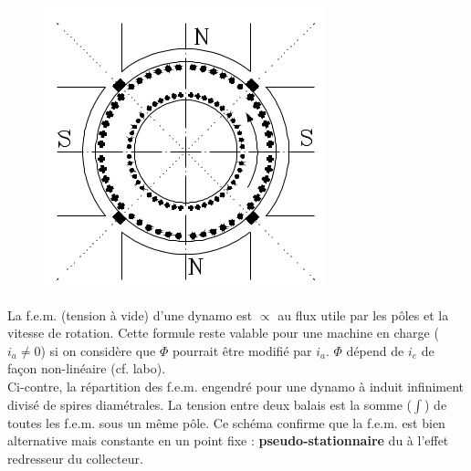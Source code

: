 		\begin{figure}
		\includegraphics[scale=0.4]{ch4/image6.png}
		\end{figure}
		La f.e.m. (tension à vide) d'une dynamo est $\propto$ au flux 
		utile par les pôles et la vitesse de rotation. Cette formule 
		reste valable pour une machine en charge ($i_a\neq0$) si on 
		considère que $\Phi$ pourrait être modifié par $i_a$. $\Phi$ 
		dépend de $i_e$ de façon non-linéaire (cf. labo).\\
		
		Ci-contre, la répartition des f.e.m. engendré pour une dynamo 
		à induit infiniment divisé de spires diamétrales. La tension 
		entre deux balais est la somme ($\int$) de toutes les f.e.m. 
		sous un même pôle. Ce schéma confirme que la f.e.m. est bien 
		alternative mais constante en un point fixe : 
		\textbf{pseudo-stationnaire} du à l'effet redresseur du 
		collecteur.

